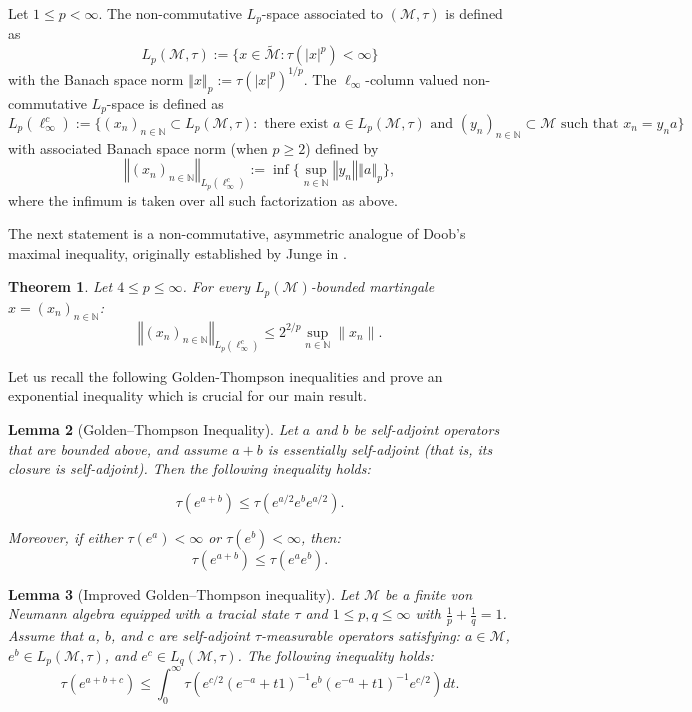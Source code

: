 \documentclass[10pt]{amsart}
\newtheorem{thm}{Theorem}[section]
\newtheorem{lem}[thm]{Lemma}
\theoremstyle{definition}
\theoremstyle{myremark}
\numberwithin{equation}{section}
\def\N{\mathbb N}
\newcommand{\CM}{\mathcal{M}}
\newcommand{\abs}[1]{\left\vert#1\right\vert}
\newcommand{\norm}[1]{\left\Vert#1\right\Vert}
\begin{document}
Let $1 \leq p< \infty$. The non-commutative $L_p$-space associated to $(\CM, \tau)$ is defined as 
\[L_p(\CM, \tau):= \{x \in \widetilde{\CM}: \tau(\abs{x}^p)< \infty \}
\]
with the Banach space norm $\norm{x}_p:= \tau(\abs{x}^p)^{1/p}$.
The $\ell_\infty$-column valued non-commutative $L_p$-space is defined as 
\[
L_p(\ell_\infty^c):= \{(x_n)_{n \in \N} \subset L_p(\CM, \tau): \text{ there exist } a \in L_{p}(\CM, \tau) \text{ and } (y_n )_{n \in \N} \subset \CM \text{ such that } x_n=  y_n a \}
\]
with associated Banach space norm (when $p\geq 2$) defined by \[
\norm{(x_n)_{n \in \N}}_{L_p(\ell_\infty^c)}:= \inf \{  \sup_{n \in \N} \norm{y_n} \norm{a}_{p} \},
\]
where the infimum is taken over all such factorization as above.

The next statement is a non-commutative, asymmetric analogue of Doob’s maximal inequality, originally established by Junge in \cite{junge2002doob}.

\begin{thm}\label{doob}
   Let $4 \le p \le \infty$. For every $L_p(\mathcal{M})$-bounded martingale
  $x=(x_n)_{n \in \N}$:
 $$\norm{(x_n)_{n \in \N}}_{L_p(\ell_\infty^c)}\leq 2^{2/p}
    \sup_{n\in \N}\|x_n\|.$$    
 \end{thm}

Let us recall the following Golden-Thompson inequalities and prove an exponential inequality which is crucial for our main result.

\begin{lem}[Golden–Thompson Inequality]\cite{ruskai1972inequalities}\label{lem: GT ineq}
    Let $a$ and $b$ be self-adjoint operators that are bounded above, and assume $a + b$ is essentially self-adjoint (that is, its closure is self-adjoint). Then the following inequality holds:

    \begin{equation}
        \tau(e^{a + b}) \leq \tau(e^{a/2} e^b e^{a/2}).
    \end{equation}
    
    \noindent Moreover, if either $\tau(e^a) < \infty$ or $\tau(e^b) < \infty$, then:
    \begin{equation}\label{GT ineq}
        \tau(e^{a + b}) \leq \tau(e^a e^b).
    \end{equation}
\end{lem}


\begin{lem}[Improved Golden–Thompson inequality]\cite{randrianantoanina2024triple}\label{lem: improved GT ineq}
    Let $\mathcal{M}$ be a finite von Neumann algebra equipped with a tracial state $\tau$ and $1 \leq p, q \leq \infty$ with $\frac{1}{p} + \frac{1}{q} = 1$. Assume that $a$, $b$, and $c$ are self-adjoint $\tau$-measurable operators satisfying: $a \in \mathcal{M}$, $e^b \in L_p(\mathcal{M}, \tau)$, and $e^c \in L_q(\mathcal{M}, \tau)$. The following inequality holds:
    $$
    \tau(e^{a + b + c}) \leq \int_0^\infty \tau\left( e^{c/2}(e^{-a} + t1)^{-1} e^b (e^{-a} + t1)^{-1} e^{c/2} \right) dt.
    $$
\end{lem}
\end{document}
